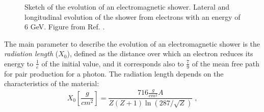 \begin{figure}[ht]
\centering
{}
\caption{ Sketch of the evolution of an electromagnetic shower. 
 Lateral and longitudinal evolution of the shower from electrons with an energy of 6 GeV. Figure from Ref. \cite{grupen_shwartz_2008}.}
\label{fig:det:shower_elec}
\end{figure}


The main parameter to describe the evolution of an electromagnetic shower is the \textit{radiation length} ($X_0$), defined as the distance over which an electron reduces its energy to $\frac{1}{e}$ of the initial value, and it corresponds also to $\frac{7}{9}$ of the mean free path for pair production for a photon. The radiation length depends on the characteristics of the material:
\begin{equation}
X_0 [\frac{g}{cm^2}] = \frac{716 \frac{g}{ cm^2} A }{Z(Z+1) \ln\left(287/\sqrt{Z}\right)} \; ,
\end{equation}

